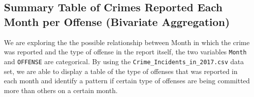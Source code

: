 \documentclass[
]{article}
\begin{document}
\subsection{Summary Table of Crimes Reported Each Month per Offense
(Bivariate
Aggregation)}\label{summary-table-of-crimes-reported-each-month-per-offense-bivariate-aggregation}

We are exploring the the possible relationship between Month in which
the crime was reported and the type of offense in the report itself, the
two variables \texttt{Month} and \texttt{OFFENSE} are categorical. By
using the \texttt{Crime\_Incidents\_in\_2017.csv} data set, we are able
to display a table of the type of offenses that was reported in each
month and identify a pattern if certain type of offenses are being
committed more than others on a certain month.

\begin{table}[!h]
\centering
\caption{\label{tab:appendix-load-wide-summary-table}Total Amount of Crimes Reported Each Month per Offense}
\centering
{}
\end{table}
\end{document}

